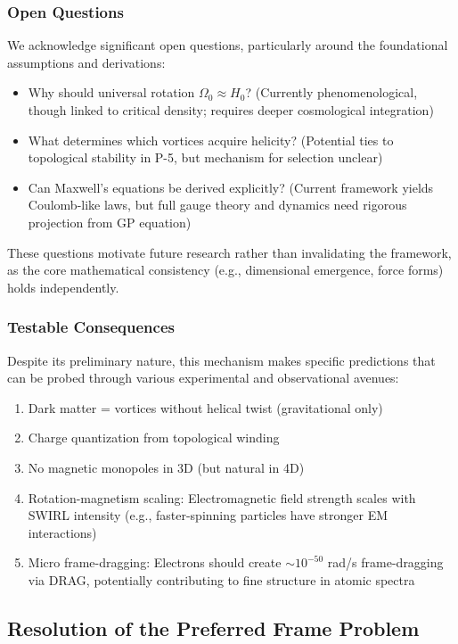 \subsubsection{Open Questions}
We acknowledge significant open questions, particularly around the foundational assumptions and derivations:
\begin{itemize}
\item Why should universal rotation $\Omega_0 \approx H_0$? (Currently phenomenological, though linked to critical density; requires deeper cosmological integration)
\item What determines which vortices acquire helicity? (Potential ties to topological stability in P-5, but mechanism for selection unclear)
\item Can Maxwell's equations be derived explicitly? (Current framework yields Coulomb-like laws, but full gauge theory and dynamics need rigorous projection from GP equation)
\end{itemize}
These questions motivate future research rather than invalidating the framework, as the core mathematical consistency (e.g., dimensional emergence, force forms) holds independently.

\subsubsection{Testable Consequences}
Despite its preliminary nature, this mechanism makes specific predictions that can be probed through various experimental and observational avenues:
\begin{enumerate}
\item Dark matter = vortices without helical twist (gravitational only)
\item Charge quantization from topological winding
\item No magnetic monopoles in 3D (but natural in 4D)
\item Rotation-magnetism scaling: Electromagnetic field strength scales with SWIRL intensity (e.g., faster-spinning particles have stronger EM interactions)
\item Micro frame-dragging: Electrons should create $\sim 10^{-50}$ rad/s frame-dragging via DRAG, potentially contributing to fine structure in atomic spectra
\end{enumerate}

\subsection{Resolution of the Preferred Frame Problem}

